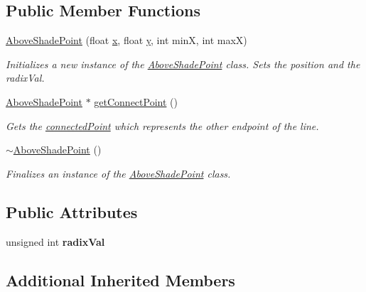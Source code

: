 \subsection*{Public Member Functions}
\begin{DoxyCompactItemize}
\item 
\hyperlink{classlighting_1_1AboveShadePoint_a13dcc1328ba52890bb23ecdb96b41de2}{Above\+Shade\+Point} (float \hyperlink{classlighting_1_1ShadePoint_a087db3eacccf6731f674f123c22400ec}{x}, float \hyperlink{classlighting_1_1ShadePoint_a427350496a448f0dd7424955a6c21ea2}{y}, int minX, int maxX)
\begin{DoxyCompactList}\small\item\em Initializes a new instance of the \hyperlink{classlighting_1_1AboveShadePoint}{Above\+Shade\+Point} class. Sets the position and the radix\+Val. \end{DoxyCompactList}\item 
\hyperlink{classlighting_1_1AboveShadePoint}{Above\+Shade\+Point} $\ast$ \hyperlink{classlighting_1_1AboveShadePoint_a68d9e7274fcc10333d16f259ae87a360}{get\+Connect\+Point} ()
\begin{DoxyCompactList}\small\item\em Gets the \hyperlink{classlighting_1_1ShadePoint_a0840495febcd385a90e89e003aa15972}{connected\+Point} which represents the other endpoint of the line. \end{DoxyCompactList}\item 
\hyperlink{classlighting_1_1AboveShadePoint_ad699ddbcdfea524594160f19021e7c2d}{$\sim$\+Above\+Shade\+Point} ()
\begin{DoxyCompactList}\small\item\em Finalizes an instance of the \hyperlink{classlighting_1_1AboveShadePoint}{Above\+Shade\+Point} class. \end{DoxyCompactList}\end{DoxyCompactItemize}
\subsection*{Public Attributes}
\begin{DoxyCompactItemize}
\item 
unsigned int {\bfseries radix\+Val}\hypertarget{classlighting_1_1AboveShadePoint_afeebe59ac2c4bce6a105e71a390c11a9}{}\label{classlighting_1_1AboveShadePoint_afeebe59ac2c4bce6a105e71a390c11a9}

\end{DoxyCompactItemize}
\subsection*{Additional Inherited Members}


